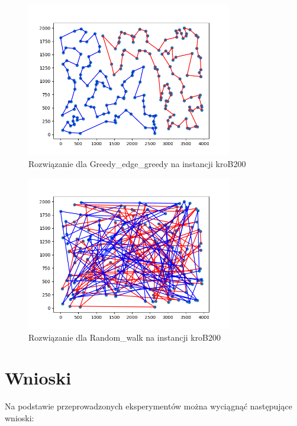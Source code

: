 \documentclass[12pt,a4paper]{article}
\begin{document}
\begin{figure}[H]
\centering
\includegraphics[width=0.8\textwidth]{figures/kroB_Greedy_E_greedy.png}
\caption{Rozwiązanie dla Greedy\_edge\_greedy na instancji kroB200}
\end{figure}

\begin{figure}[H]
\centering
\includegraphics[width=0.8\textwidth]{figures/kroB_random_walk.png}
\caption{Rozwiązanie dla Random\_walk na instancji kroB200}
\end{figure}

\section{Wnioski}
Na podstawie przeprowadzonych eksperymentów można wyciągnąć następujące wnioski:
\end{document}
